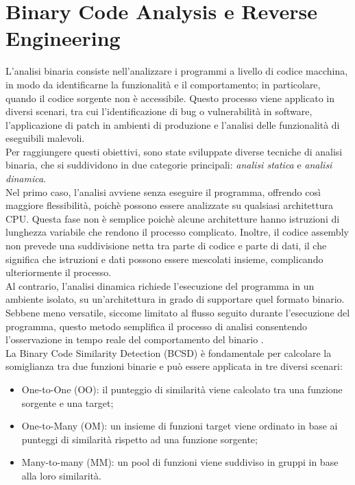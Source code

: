 \documentclass[12pt,a4paper,openright,twoside]{report}
\begin{document}
\section{Binary Code Analysis e Reverse Engineering}

L'analisi binaria consiste nell'analizzare i programmi a livello di codice macchina, in modo da identificarne la funzionalità e il comportamento; in particolare, quando il codice sorgente non è accessibile. Questo processo viene applicato in diversi scenari, tra cui l'identificazione di bug o vulnerabilità in software, l'applicazione di patch in ambienti di produzione e l'analisi delle funzionalità di eseguibili malevoli.\\
Per raggiungere questi obiettivi, sono state sviluppate diverse tecniche di analisi binaria, che si suddividono in due categorie principali: \textit{analisi statica} e \textit{analisi dinamica}.\\
Nel primo caso, l'analisi avviene senza eseguire il programma, offrendo così maggiore flessibilità, poichè possono essere analizzate su qualsiasi architettura CPU. Questa fase non è semplice poichè alcune architetture hanno istruzioni di lunghezza variabile che rendono il processo complicato. Inoltre, il codice assembly non prevede una suddivisione netta tra parte di codice e parte di dati, il che significa che istruzioni e dati possono essere mescolati insieme, complicando ulteriormente il processo.\\
Al contrario, l'analisi dinamica richiede l'esecuzione del programma in un ambiente isolato, su un'architettura in grado di supportare quel formato binario. Sebbene meno versatile, siccome limitato al flusso seguito durante l'esecuzione del programma, questo metodo semplifica il processo di analisi consentendo l'osservazione in tempo reale del comportamento del binario \cite{artuso2025deeplearning}.\\
La Binary Code Similarity Detection (BCSD) è fondamentale per calcolare la somiglianza tra due funzioni binarie e può essere applicata in tre diversi scenari:
 \begin{itemize}
     \item One-to-One (OO): il punteggio di similarità viene calcolato tra una funzione sorgente e una target;
     \item One-to-Many (OM): un insieme di funzioni target viene ordinato in base ai punteggi di similarità rispetto ad una funzione sorgente;
     \item Many-to-many (MM): un pool di funzioni viene suddiviso in gruppi in base alla loro similarità.
     \end{itemize}
\end{document}
